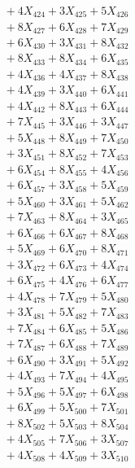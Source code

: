 \documentclass[a4paper,10pt]{article}
\begin{document}
{\begin{align}
&\;  + 4 X_{424} + 3 X_{425} + 5 X_{426} \\[0.3ex]
&\;  + 8 X_{427} + 6 X_{428} + 7 X_{429} \\[0.5ex]\allowbreak
&\;  + 6 X_{430} + 3 X_{431} + 8 X_{432} \\[0.3ex]
&\;  + 8 X_{433} + 8 X_{434} + 6 X_{435} \\[0.3ex]
&\;  + 4 X_{436} + 4 X_{437} + 8 X_{438} \\[0.3ex]
&\;  + 4 X_{439} + 3 X_{440} + 6 X_{441} \\[0.3ex]
&\;  + 4 X_{442} + 8 X_{443} + 6 X_{444} \\[0.3ex]
&\;  + 7 X_{445} + 3 X_{446} + 3 X_{447} \\[0.3ex]
&\;  + 5 X_{448} + 8 X_{449} + 7 X_{450} \\[0.3ex]
&\;  + 3 X_{451} + 8 X_{452} + 7 X_{453} \\[0.3ex]
&\;  + 6 X_{454} + 8 X_{455} + 4 X_{456} \\[0.3ex]
&\;  + 6 X_{457} + 3 X_{458} + 5 X_{459} \\[0.5ex]\allowbreak
&\;  + 5 X_{460} + 3 X_{461} + 5 X_{462} \\[0.3ex]
&\;  + 7 X_{463} + 8 X_{464} + 3 X_{465} \\[0.3ex]
&\;  + 6 X_{466} + 6 X_{467} + 8 X_{468} \\[0.3ex]
&\;  + 5 X_{469} + 6 X_{470} + 8 X_{471} \\[0.3ex]
&\;  + 3 X_{472} + 6 X_{473} + 4 X_{474} \\[0.3ex]
&\;  + 6 X_{475} + 4 X_{476} + 6 X_{477} \\[0.3ex]
&\;  + 4 X_{478} + 7 X_{479} + 5 X_{480} \\[0.3ex]
&\;  + 3 X_{481} + 5 X_{482} + 7 X_{483} \\[0.3ex]
&\;  + 7 X_{484} + 6 X_{485} + 5 X_{486} \\[0.3ex]
&\;  + 7 X_{487} + 6 X_{488} + 7 X_{489} \\[0.5ex]\allowbreak
&\;  + 6 X_{490} + 3 X_{491} + 5 X_{492} \\[0.3ex]
&\;  + 4 X_{493} + 7 X_{494} + 4 X_{495} \\[0.3ex]
&\;  + 5 X_{496} + 5 X_{497} + 6 X_{498} \\[0.3ex]
&\;  + 6 X_{499} + 5 X_{500} + 7 X_{501} \\[0.3ex]
&\;  + 8 X_{502} + 5 X_{503} + 8 X_{504} \\[0.3ex]
&\;  + 4 X_{505} + 7 X_{506} + 3 X_{507} \\[0.3ex]
&\;  + 4 X_{508} + 4 X_{509} + 3 X_{510} \\[0.3ex]

\end{align}}
\end{document}
